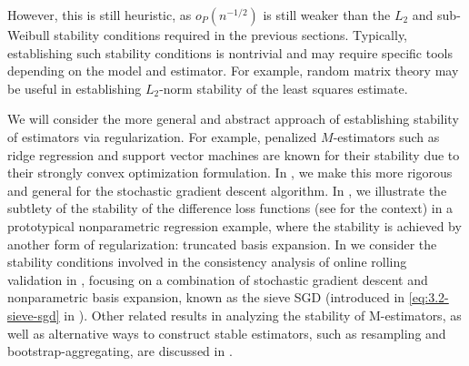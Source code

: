 \documentclass[11pt]{article}
\theoremstyle{plain}
\begin{document}
However, this is still heuristic, as $o_P(n^{-1/2})$ is still weaker than the $L_2$ and sub-Weibull stability conditions required in the previous sections.  Typically, establishing such stability conditions is nontrivial and may require specific tools depending on the model and estimator. For example, random matrix theory may be useful in establishing $L_2$-norm stability of the least squares estimate.


We will consider the more general and abstract approach of establishing stability of estimators via regularization.  For example, penalized $M$-estimators such as ridge regression and support vector machines are known for their stability due to their strongly convex optimization formulation.  In , we make this more rigorous and general for the stochastic gradient descent algorithm.  In  , we illustrate the subtlety of the stability of the difference loss functions (see  for the context) in a prototypical nonparametric regression example, where the stability is achieved by another form of regularization: truncated basis expansion.  In  we consider the stability conditions involved in the consistency analysis of online rolling validation in , focusing on a combination of stochastic gradient descent and nonparametric basis expansion, known as the sieve SGD (introduced in \eqref{eq:3.2-sieve-sgd} in ).  Other related results in analyzing the stability of M-estimators, as well as alternative ways to construct stable estimators, such as resampling and bootstrap-aggregating, are discussed in .

\end{document}
